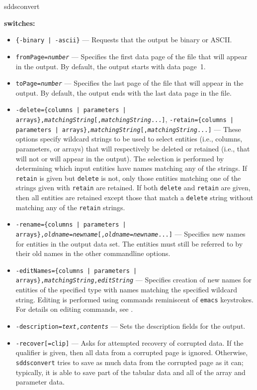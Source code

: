 \begin{sddsprog}{sddsconvert}
  \item \textbf{switches:}
    \begin{itemize}
    \item {\tt \{-binary | -ascii\}} --- Requests that the output be binary or ASCII.
    \item {\tt fromPage=\emph{number}} --- Specifies the first data page of the file that will appear in the output. By default, the output starts with data page~1.
    \item {\tt toPage=\emph{number}} --- Specifies the last page of the file that will appear in the output. By default, the output ends with the last data page in the file.
    \item {\tt -delete=\{columns | parameters | arrays\},\emph{matchingString}[,\emph{matchingString}...]}, {\tt -retain=\{columns | parameters | arrays\},\emph{matchingString}[,\emph{matchingString}...]} --- These options specify wildcard strings to be used to select entities (i.e., columns, parameters, or arrays) that will respectively be deleted or retained (i.e., that will not or will appear in the output). The selection is performed by determining which input entities have names matching any of the strings. If \verb|retain| is given but \verb|delete| is not, only those entities matching one of the strings given with \verb|retain| are retained. If both \verb|delete| and \verb|retain| are given, then all entities are retained except those that match a \verb|delete| string without matching any of the \verb|retain| strings.
    \item {\tt -rename=\{columns | parameters | arrays\},\emph{oldname}=\emph{newname}[,\emph{oldname}=\emph{newname}...]} --- Specifies new names for entities in the output data set. The entities must still be referred to by their old names in the other commandline options.
    \item {\tt -editNames=\{columns | parameters | arrays\},\emph{matchingString},\emph{editString}} --- Specifies creation of new names for entities of the specified type with names matching the specified wildcard string. Editing is performed using commands reminiscent of \verb|emacs| keystrokes. For details on editing commands, see .
    \item {\tt -description=\emph{text},\emph{contents}} --- Sets the description fields for the output.
    \item {\tt -recover[=clip]} --- Asks for attempted recovery of corrupted data. If the qualifier is given, then all data from a corrupted page is ignored. Otherwise, \verb|sddsconvert| tries to save as much data from the corrupted page as it can; typically, it is able to save part of the tabular data and all of the array and parameter data.

\end{itemize}
\end{sddsprog}
